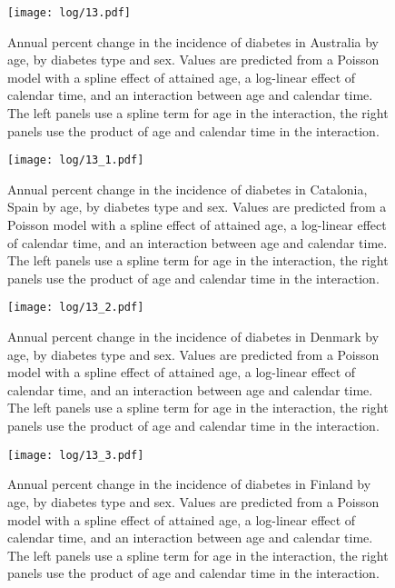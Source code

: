 \documentclass[11pt]{article}
\begin{document}
\color{Blue4}
\begin{stlog}\end{stlog}
\begin{figure}
    \centering
    \texttt{[image: log/13.pdf]}
    \caption{Annual percent change in the incidence of diabetes in Australia by age, by diabetes type and sex. Values are predicted from a Poisson model with a spline effect of attained age, a log-linear effect of calendar time, and an interaction between age and calendar time. The left panels use a spline term for age in the interaction, the right panels use the product of age and calendar time in the interaction.}
    \label{Australia apcageg}
\end{figure}
\begin{figure}
    \centering
    \texttt{[image: log/13\_1.pdf]}
    \caption{Annual percent change in the incidence of diabetes in Catalonia, Spain by age, by diabetes type and sex. Values are predicted from a Poisson model with a spline effect of attained age, a log-linear effect of calendar time, and an interaction between age and calendar time. The left panels use a spline term for age in the interaction, the right panels use the product of age and calendar time in the interaction.}
    \label{Catalonia, Spain apcageg}
\end{figure}
\begin{figure}
    \centering
    \texttt{[image: log/13\_2.pdf]}
    \caption{Annual percent change in the incidence of diabetes in Denmark by age, by diabetes type and sex. Values are predicted from a Poisson model with a spline effect of attained age, a log-linear effect of calendar time, and an interaction between age and calendar time. The left panels use a spline term for age in the interaction, the right panels use the product of age and calendar time in the interaction.}
    \label{Denmark apcageg}
\end{figure}
\begin{figure}
    \centering
    \texttt{[image: log/13\_3.pdf]}
    \caption{Annual percent change in the incidence of diabetes in Finland by age, by diabetes type and sex. Values are predicted from a Poisson model with a spline effect of attained age, a log-linear effect of calendar time, and an interaction between age and calendar time. The left panels use a spline term for age in the interaction, the right panels use the product of age and calendar time in the interaction.}
    \label{Finland apcageg}
\end{figure}
\end{document}

